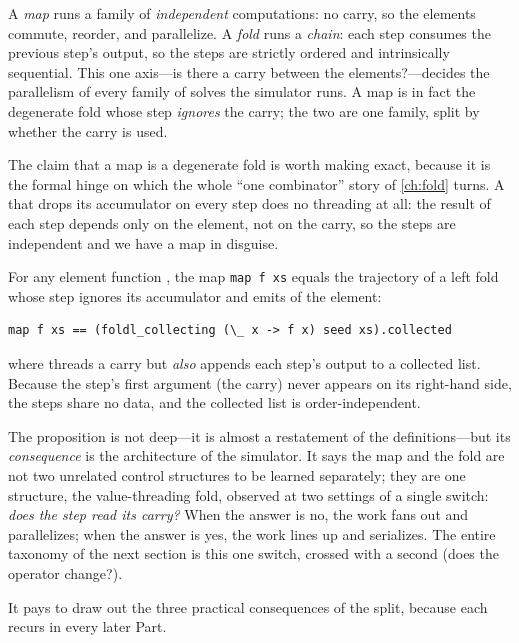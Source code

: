 \begin{keyidea}
A \emph{map} runs a family of \emph{independent} computations: no carry, so the
elements commute, reorder, and parallelize. A \emph{fold} runs a \emph{chain}:
each step consumes the previous step's output, so the steps are strictly ordered
and intrinsically sequential. This one axis---is there a carry between the
elements?---decides the parallelism of every family of solves the simulator runs.
A map is in fact the degenerate fold whose step \emph{ignores} the carry; the two
are one family, split by whether the carry is used.
\end{keyidea}

The claim that a map is a degenerate fold is worth making exact, because it is the
formal hinge on which the whole ``one combinator'' story of \cref{ch:fold} turns.
A  that drops its accumulator on every step does no threading at all:
the result of each step depends only on the element, not on the carry, so the steps
are independent and we have a map in disguise.

\begin{proposition}
\label{prop:mapfold}
For any element function , the map \lstinline[style=l4style]|map f xs| equals
the trajectory of a left fold whose step ignores its accumulator and emits
 of the element:
\begin{lstlisting}[style=l4style]
map f xs == (foldl_collecting (\_ x -> f x) seed xs).collected
\end{lstlisting}
where  threads a carry but \emph{also} appends each step's
output to a collected list. Because the step's first argument (the carry) never
appears on its right-hand side, the steps share no data, and the collected list is
order-independent.
\end{proposition}

The proposition is not deep---it is almost a restatement of the definitions---but
its \emph{consequence} is the architecture of the simulator. It says the map and
the fold are not two unrelated control structures to be learned separately; they
are one structure, the value-threading fold, observed at two settings of a single
switch: \emph{does the step read its carry?} When the answer is no, the work fans
out and parallelizes; when the answer is yes, the work lines up and serializes. The
entire taxonomy of the next section is this one switch, crossed with a second
(does the operator change?).

It pays to draw out the three practical consequences of the split, because each
recurs in every later Part.

